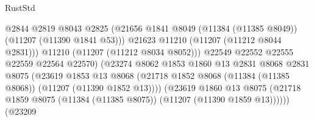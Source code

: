 \begin{lexlean}{RustStd}
\begin{coremodule}
                                              @2844
                                              @2819
                                              @8043
                                              @2825
                                              (@21656
                                                @1841
                                                @8049
                                                (@11384 (@11385 @8049))
                                                (@11207 (@11390 @1841 @53)))
                                              @21623
                                              @11210
                                              (@11207 (@11212 @8044 @2831)))
                                            @11210
                                            (@11207 (@11212 @8034 @8052)))
                                          @22549
                                          @22552
                                          @22555
                                          @22559
                                          @22564
                                          @22570)
                                        (@23274
                                          @8062
                                          @1853
                                          @1860
                                          @13
                                          @2831
                                          @8068
                                          @2831
                                          @8075
                                          (@23619
                                            @1853
                                            @13
                                            @8068
                                            (@21718
                                              @1852
                                              @8068
                                              (@11384 (@11385 @8068))
                                              (@11207 (@11390 @1852 @13))))
                                          (@23619
                                            @1860
                                            @13
                                            @8075
                                            (@21718
                                              @1859
                                              @8075
                                              (@11384 (@11385 @8075))
                                              (@11207 (@11390 @1859 @13))))))
                                      (@23209

\end{coremodule}
\end{lexlean}
